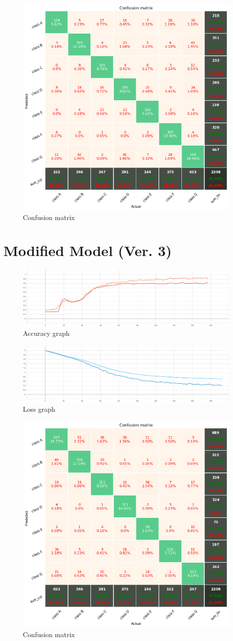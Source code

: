 \begin{figure}[htbp]
\centering
\includegraphics[width=0.6\linewidth]{results/fig/confusion2.png}
\caption{Confusion matrix}
\label{fig:confusion2}
\end{figure}

\newpage
\section{Modified Model (Ver. 3)}

\begin{figure}[htbp]
\centering
\includegraphics[width=0.7\linewidth]{results/fig/Accuracy3.png}
\caption{Accuracy graph}
\label{fig:accuracy3}
\end{figure}

\begin{figure}[htbp]
\centering
\includegraphics[width=0.7\linewidth]{results/fig/Loss3.png}
\caption{Loss graph}
\label{fig:evaluation3}
\end{figure}

\begin{figure}[htbp]
\centering
\includegraphics[width=0.6\linewidth]{results/fig/confusion3.png}
\caption{Confusion matrix}
\label{fig:confusion3}
\end{figure}
